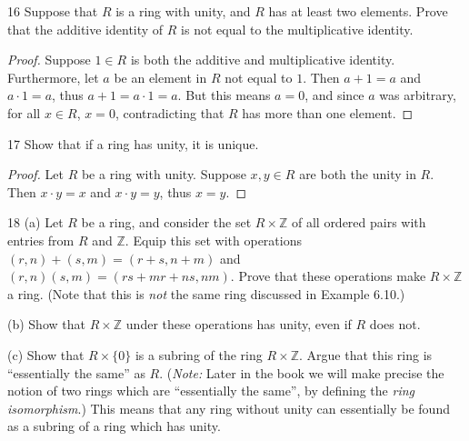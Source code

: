 \begin{problem}{16}
    Suppose that $R$ is a ring with unity, and $R$ has at least two elements.
    Prove that the additive identity of $R$ is not equal to the multiplicative 
        identity.
\end{problem}
\solved

\begin{proof}
    Suppose $1 \in R$ is both the additive and multiplicative identity.
    Furthermore, let $a$ be an element in $R$ not equal to $1$.
    Then $a + 1 = a$ and $a \cdot 1 = a$, thus $a + 1 = a \cdot 1 = a$.
    But this means $a = 0$, and since $a$ was arbitrary, for all 
        $x \in R$, $x = 0$, contradicting that $R$ has more than one element.
\end{proof}

\begin{problem}{17}
    Show that if a ring has unity, it is unique.
\end{problem}
\solved

\begin{proof}
    Let $R$ be a ring with unity.
    Suppose $x, y \in R$ are both the unity in $R$.
    Then $x \cdot y = x$ and $x \cdot y = y$, thus $x = y$.
\end{proof}

\begin{problem}{18}
    (a) Let $R$ be a ring, and consider the set $R \times \mathbb{Z}$
        of all ordered pairs with entries from $R$ and $\mathbb{Z}$.
        Equip this set with operations
        $(r, n) + (s, m) = (r + s, n + m)$
        and
        $(r, n)(s, m) = (rs + mr + ns, nm)$. Prove that these operations make 
        $R \times \mathbb{Z}$ a ring. (Note that this is \emph{not} the 
        same ring discussed in Example 6.10.)

    (b) Show that $R \times \mathbb{Z}$ under these operations has unity, 
        even if $R$ does not.

    (c) Show that $R \times \{0\}$ is a subring of the ring $R \times \mathbb{Z}$.
        Argue that this ring is ``essentially the same'' as $R$. (\emph{Note: } Later in the 
        book we will make precise the notion of two rings which are ``essentially the same'', by defining 
        the \emph{ring isomorphism}.) This means that any ring without unity can essentially be found as 
        a subring of a ring which has unity.
\end{problem}
\solved

